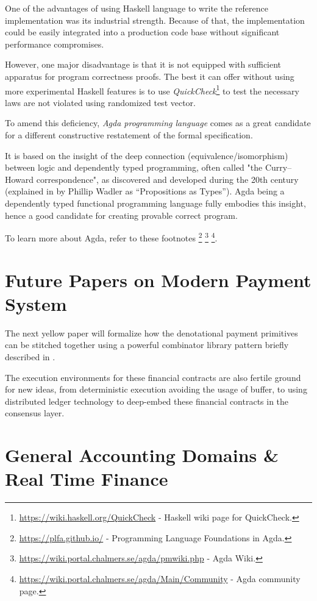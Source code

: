 One of the advantages of using Haskell language to write the reference implementation was its
industrial strength. Because of that, the implementation could be easily integrated into a
production code base without significant performance compromises.

However, one major disadvantage is that it is not equipped with sufficient apparatus for program
correctness proofs. The best it can offer without using more experimental Haskell features is to
use \textit{QuickCheck}\footnote{\url{https://wiki.haskell.org/QuickCheck} - Haskell wiki page for
QuickCheck.} to test the necessary laws are not violated using randomized test vector.

To amend this deficiency, \textit{Agda programming language} comes as a great candidate for a
different constructive restatement of the formal specification.

It is based on the insight of the deep connection (equivalence/isomorphism) between logic and
dependently typed programming, often called "the Curry–Howard correspondence", as discovered and
developed during the 20th century (explained in \cite{wadler2015propositions} by Phillip Wadler as
``Propositions as Types''). Agda being a dependently typed functional programming language fully
embodies this insight, hence a good candidate for creating provable correct program.

To learn more about Agda, refer to these footnotes
\footnote{\url{https://plfa.github.io/} - Programming Language Foundations in Agda.}
\footnote{\url{https://wiki.portal.chalmers.se/agda/pmwiki.php} - Agda Wiki.}
\footnote{\url{https://wiki.portal.chalmers.se/agda/Main/Community} - Agda community page.}.

\section{Future Papers on Modern Payment System}

The next yellow paper will formalize how the denotational payment primitives can be stitched
together using a powerful combinator library pattern briefly described
in \cite{peyton2000composing}.

The execution environments for these financial contracts are also fertile ground for new ideas, from
deterministic execution avoiding the usage of buffer, to using distributed ledger technology to
deep-embed these financial contracts in the consensus layer.

\section{General Accounting Domains \& Real Time Finance}

